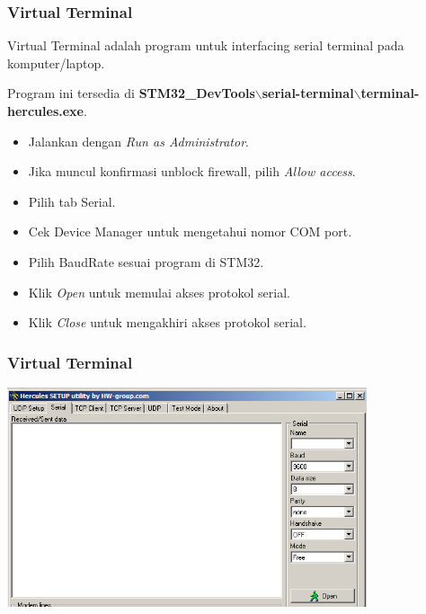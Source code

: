 \documentclass[table,dvipsnames]{beamer}
\begin{document}
	\begin{frame}
		\frametitle{Virtual Terminal}
		\begin{exampleblock}{}
			Virtual Terminal adalah program untuk interfacing serial terminal pada komputer/laptop.
		\end{exampleblock}

		\begin{exampleblock}{}
			Program ini tersedia di \textbf{STM32\_DevTools$\backslash$serial-terminal$\backslash$terminal-hercules.exe}.
			\begin{itemize}
				\item Jalankan dengan \textit{Run as Administrator}.
				\item Jika muncul konfirmasi unblock firewall, pilih \textit{Allow access}.
				\item Pilih tab Serial.
				\item Cek Device Manager untuk mengetahui nomor COM port.
				\item Pilih BaudRate sesuai program di STM32.
				\item Klik \textit{Open} untuk memulai akses protokol serial.
				\item Klik \textit{Close} untuk mengakhiri akses protokol serial.
			\end{itemize}
		\end{exampleblock}
	\end{frame}

	\begin{frame}
		\frametitle{Virtual Terminal}
		\begin{exampleblock}{}
			\begin{center}
				\includegraphics[width=300pt]{images/serterm}
			\end{center}
		\end{exampleblock}
	\end{frame}
\end{document}
